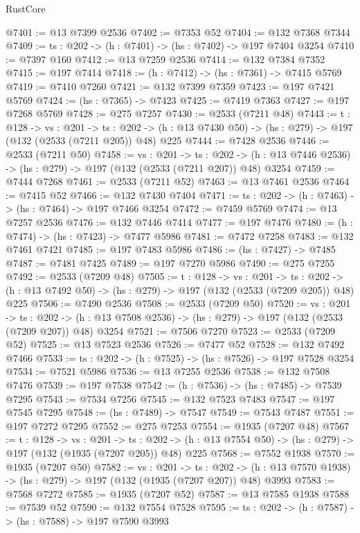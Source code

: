 \begin{lexlean}{RustCore}
\begin{coremodule}
@7401 := @13 @7399 @2536
@7402 := @7353 @52
@7404 := @132 @7368 @7344
@7409 := {ts : @202} -> (h : @7401) -> (hs : @7402) -> @197 @7404 @3254
@7410 := @7397 @160
@7412 := @13 @7259 @2536
@7414 := @132 @7384 @7352
@7415 := @197 @7414
@7418 := (h : @7412) -> (hs : @7361) -> @7415 @5769
@7419 := @7410 @7260
@7421 := @132 @7399 @7359
@7423 := @197 @7421 @5769
@7424 := (hs : @7365) -> @7423
@7425 := @7419 @7363
@7427 := @197 @7268 @5769
@7428 := @275 @7257
@7430 := @2533 (@7211 @48)
@7443 := {t : @128} ->
  {vs : @201} ->
  {ts : @202} -> (h : @13 @7430 @50) -> (hs : @279) -> @197 (@132 (@2533 (@7211 @205)) @48) @225
@7444 := @7428 @2536
@7446 := @2533 (@7211 @50)
@7458 := {vs : @201} ->
  {ts : @202} -> (h : @13 @7446 @2536) -> (hs : @279) -> @197 (@132 (@2533 (@7211 @207)) @48) @3254
@7459 := @7444 @7268
@7461 := @2533 (@7211 @52)
@7463 := @13 @7461 @2536
@7464 := @7415 @52
@7466 := @132 @7430 @7404
@7471 := {ts : @202} -> (h : @7463) -> (hs : @7464) -> @197 @7466 @3254
@7472 := @7459 @5769
@7474 := @13 @7257 @2536
@7476 := @132 @7446 @7414
@7477 := @197 @7476
@7480 := (h : @7474) -> (hs : @7423) -> @7477 @5986
@7481 := @7472 @7258
@7483 := @132 @7461 @7421
@7485 := @197 @7483 @5986
@7486 := (hs : @7427) -> @7485
@7487 := @7481 @7425
@7489 := @197 @7270 @5986
@7490 := @275 @7255
@7492 := @2533 (@7209 @48)
@7505 := {t : @128} ->
  {vs : @201} ->
  {ts : @202} -> (h : @13 @7492 @50) -> (hs : @279) -> @197 (@132 (@2533 (@7209 @205)) @48) @225
@7506 := @7490 @2536
@7508 := @2533 (@7209 @50)
@7520 := {vs : @201} ->
  {ts : @202} -> (h : @13 @7508 @2536) -> (hs : @279) -> @197 (@132 (@2533 (@7209 @207)) @48) @3254
@7521 := @7506 @7270
@7523 := @2533 (@7209 @52)
@7525 := @13 @7523 @2536
@7526 := @7477 @52
@7528 := @132 @7492 @7466
@7533 := {ts : @202} -> (h : @7525) -> (hs : @7526) -> @197 @7528 @3254
@7534 := @7521 @5986
@7536 := @13 @7255 @2536
@7538 := @132 @7508 @7476
@7539 := @197 @7538
@7542 := (h : @7536) -> (hs : @7485) -> @7539 @7295
@7543 := @7534 @7256
@7545 := @132 @7523 @7483
@7547 := @197 @7545 @7295
@7548 := (hs : @7489) -> @7547
@7549 := @7543 @7487
@7551 := @197 @7272 @7295
@7552 := @275 @7253
@7554 := @1935 (@7207 @48)
@7567 := {t : @128} ->
  {vs : @201} ->
  {ts : @202} -> (h : @13 @7554 @50) -> (hs : @279) -> @197 (@132 (@1935 (@7207 @205)) @48) @225
@7568 := @7552 @1938
@7570 := @1935 (@7207 @50)
@7582 := {vs : @201} ->
  {ts : @202} -> (h : @13 @7570 @1938) -> (hs : @279) -> @197 (@132 (@1935 (@7207 @207)) @48) @3993
@7583 := @7568 @7272
@7585 := @1935 (@7207 @52)
@7587 := @13 @7585 @1938
@7588 := @7539 @52
@7590 := @132 @7554 @7528
@7595 := {ts : @202} -> (h : @7587) -> (hs : @7588) -> @197 @7590 @3993

\end{coremodule}
\end{lexlean}
